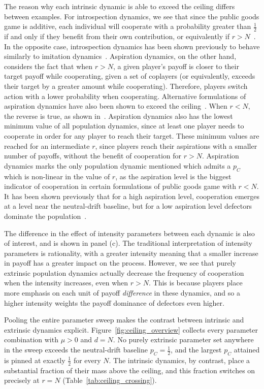 \documentclass{article}
\begin{document}
The reason why each intrinsic dynamic is able to exceed the ceiling differs
between examples. For introspection dynamics, we see that since the public goods
game is additive, each individual will cooperate with a probability greater than
\(\frac{1}{2}\) if and only if they benefit from their own contribution, or
equivalently if \(r > N\)~\cite{Couto2023, foster_knight_2026}. In the opposite
case, introspection dynamics has been shown previously to behave similarly to
imitation dynamics~\cite{Couto2023}. Aspiration dynamics, on the other hand,
considers the fact that when \(r>N\), a given player's payoff is closer to their
target payoff while cooperating, given a set of coplayers (or equivalently,
exceeds their target by a greater amount while cooperating). Therefore, players
switch action with a lower probability when cooperating. Alternative
formulations of aspiration dynamics have also been shown to exceed the
ceiling~\cite{Wang2025}. When \(r<N\), the reverse is true, as shown
in~\cite{du2014aspiration}. Aspiration dynamics also has the lowest minimum
value of all population dynamics, since at least one player needs to cooperate
in order for any player to reach their target. These minimum values are reached
for an intermediate \(r\), since players reach their aspirations with a smaller
number of payoffs, without the benefit of cooperation for \(r>N\). Aspiration
dynamics marks the only population dynamic mentioned which admits a \(p_C\)
which is non-linear in the value of \(r\), as the aspiration level is the
biggest indicator of cooperation in certain formulations of public goods game
with \(r<N\). It has been shown previously that for a high aspiration level,
cooperation emerges at a level near the neutral-drift baseline, but for a low
aspiration level defectors dominate the population~\cite{du2014aspiration}.

The difference in the effect of intensity parameters between each dynamic is
also of interest, and is shown in panel (c). The traditional interpretation of
intensity parameters is rationality, with a greater intensity meaning that a
smaller increase in payoff has a greater impact on the process. However, we see
that purely extrinsic population dynamics actually decrease the frequency of
cooperation when the intensity increases, even when \(r>N\). This is because
players place more emphasis on each unit of payoff \emph{difference} in these
dynamics, and so a higher intensity weights the payoff dominance of defectors
even higher.

Pooling the entire parameter sweep makes the contrast between intrinsic and
extrinsic dynamics explicit. Figure~\ref{fig:ceiling_overview} collects every
parameter combination with \(\mu > 0\) and \(d=N\). No purely extrinsic
parameter set anywhere in the sweep exceeds the neutral-drift baseline \(p_C =
\frac{1}{2}\), and the largest \(p_C\) attained is pinned at exactly
\(\frac{1}{2}\) for every \(N\). The intrinsic dynamics, by contrast, place a
substantial fraction of their mass above the ceiling, and this fraction switches
on precisely at \(r = N\) (Table~\ref{tab:ceiling_crossing}). 
\end{document}
